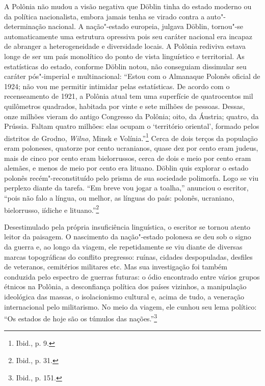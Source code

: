 A Polônia não mudou a visão negativa que Döblin tinha do estado moderno
ou da política nacionalista, embora jamais tenha se virado contra a
auto"-determinação nacional. A nação"-estado europeia, julgava Döblin,
tornou"-se automaticamente uma estrutura opressiva pois seu caráter
nacional era incapaz de abranger a heterogeneidade e diversidade locais.
A Polônia rediviva estava longe de ser um país monolítico do ponto de
vista linguístico e territorial. As estatísticas do estado, conforme
Döblin notou, não conseguiam dissimular seu caráter pós"-imperial e
multinacional: ``Estou com o Almanaque Polonês oficial de 1924; não vou
me permitir intimidar pelas estatísticas. De acordo com o recenseamento
de 1921, a Polônia atual tem uma superfície de quatrocentos mil
quilômetros quadrados, habitada por vinte e sete milhões de pessoas.
Dessas, onze milhões vieram do antigo Congresso da Polônia; oito, da
Áustria; quatro, da Prússia. Faltam quatro milhões: elas ocupam o
`território oriental', formado pelos distritos de Grodno, \textit{Wilno}, Minsk e
Volínia.''\footnote{Ibid., p. 9.} Cerca de dois terços da população eram
poloneses, quatorze por cento ucranianos, quase dez por cento eram
judeus, mais de cinco por cento eram bielorrussos, cerca de dois e meio
por cento eram alemães, e menos de meio por cento era lituano. Döblin
quis explorar o estado polonês recém"-reconstituído pelo prisma de sua
sociedade polimorfa. Logo se viu perplexo diante da tarefa. ``Em breve
vou jogar a toalha,'' anunciou o escritor, ``pois não falo a língua, ou
melhor, as línguas do país: polonês, ucraniano, bielorrusso, iídiche e
lituano.''\footnote{Ibid., p. 31.}

%

Desestimulado pela própria insuficiência linguística, o escritor se
tornou atento leitor da paisagem. O nascimento da nação"-estado polonesa
se deu sob o signo da guerra e, ao longo da viagem, ele repetidamente se
viu diante de diversas marcas topográficas do conflito pregresso:
ruínas, cidades despopuladas, desfiles de veteranos, cemitérios
militares etc. Mas sua investigação foi também conduzida pelo espectro
de guerras futuras: o ódio encontrado entre vários grupos étnicos na
Polônia, a desconfiança política dos países vizinhos, a manipulação
ideológica das massas, o isolacionismo cultural e, acima de tudo, a
veneração internacional pelo militarismo. No meio da viagem, ele cunhou
seu lema político: ``Os estados de hoje são os túmulos das
nações.''\footnote{Ibid., p. 151.}

